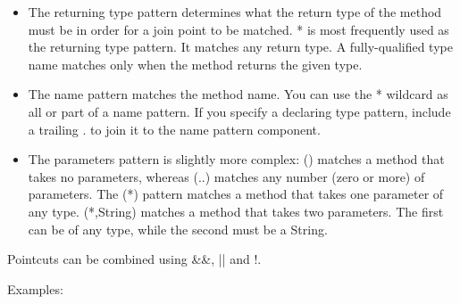 \documentclass{scrartcl}
\begin{document}
\begin{itemize}
    \item The returning type pattern determines what the return type of the method must be in order for a join point to be matched. * is most frequently used as the returning type pattern. It matches any return type. A fully-qualified type name matches only when the method returns the given type.
    \item  The name pattern matches the method name. You can use the * wildcard as all or part of a name pattern. If you specify a declaring type pattern, include a trailing . to join it to the name pattern component.
    \item The parameters pattern is slightly more complex: () matches a method that takes no parameters, whereas (..) matches any number (zero or more) of parameters. The (*) pattern matches a method that takes one parameter of any type. (*,String) matches a method that takes two parameters. The first can be of any type, while the second must be a String.

\end{itemize}

Pointcuts can be combined using \&\&, || and !.

Examples:
\end{document}
